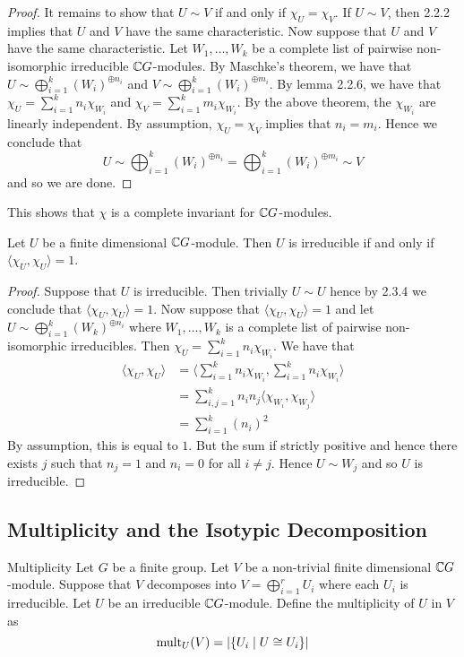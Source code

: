 \documentclass[a4paper]{article}
\begin{document}
\begin{thm}{}{}
\begin{proof}
It remains to show that $U\sim V$ if and only if $\chi_U=\chi_V$. If $U\sim V$, then 2.2.2 implies that $U$ and $V$ have the same characteristic. Now suppose that $U$ and $V$ have the same characteristic. Let $W_1,\dots,W_k$ be a complete list of pairwise non-isomorphic irreducible $\mathbb{C} G$-modules. By Maschke's theorem, we have that $U\sim\bigoplus_{i=1}^k(W_i)^{\oplus n_i}$ and $V\sim\bigoplus_{i=1}^k(W_i)^{\oplus m_i}$. By lemma 2.2.6, we have that $\chi_U=\sum_{i=1}^kn_i\chi_{W_i}$ and $\chi_V=\sum_{i=1}^km_i\chi_{W_i}$. By the above theorem, the $\chi_{W_i}$ are linearly independent. By assumption, $\chi_U=\chi_V$ implies that $n_i=m_i$. Hence we conclude that $$U\sim\bigoplus_{i=1}^k(W_i)^{\oplus n_i}=\bigoplus_{i=1}^k(W_i)^{\oplus m_i}\sim V$$ and so we are done. 
\end{proof}
\end{thm}

This shows that $\chi$ is a complete invariant for $\mathbb{C} G$-modules. 

\begin{lmm}{}{} Let $U$ be a finite dimensional $\mathbb{C} G$-module. Then $U$ is irreducible if and only if $\langle\chi_U,\chi_U\rangle=1$. \tcbline
\begin{proof}
Suppose that $U$ is irreducible. Then trivially $U\sim U$ hence by 2.3.4 we conclude that $\langle\chi_U,\chi_U\rangle=1$. Now suppose that $\langle\chi_U,\chi_U\rangle=1$ and let $U\sim\bigoplus_{i=1}^k(W_k)^{\oplus n_i}$ where $W_1,\dots,W_k$ is a complete list of pairwise non-isomorphic irreducibles. Then $\chi_U=\sum_{i=1}^kn_i\chi_{W_i}$. We have that 
\begin{align*}
\langle\chi_U,\chi_U\rangle&=\langle\sum_{i=1}^kn_i\chi_{W_i},\sum_{i=1}^kn_i\chi_{W_i}\rangle\\
&=\sum_{i,j=1}^kn_in_j\langle\chi_{W_i},\chi_{W_j}\rangle\\
&=\sum_{i=1}^k(n_i)^2
\end{align*}
By assumption, this is equal to $1$. But the sum if strictly positive and hence there exists $j$ such that $n_j=1$ and $n_i=0$ for all $i\neq j$. Hence $U\sim W_j$ and so $U$ is irreducible. 
\end{proof}
\end{lmm}

\subsection{Multiplicity and the Isotypic Decomposition}
\begin{defn}{Multiplicity}{} Let $G$ be a finite group. Let $V$ be a non-trivial finite dimensional $\mathbb{C} G$-module. Suppose that $V$ decomposes into $V=\bigoplus_{i=1}^rU_i$ where each $U_i$ is irreducible. Let $U$ be an irreducible $\mathbb{C} G$-module. Define the multiplicity of $U$ in $V$ as $$\text{mult}_U(V)=\abs{\{U_i\;|\;U\cong U_i\}}$$
\end{defn}
\end{document}
